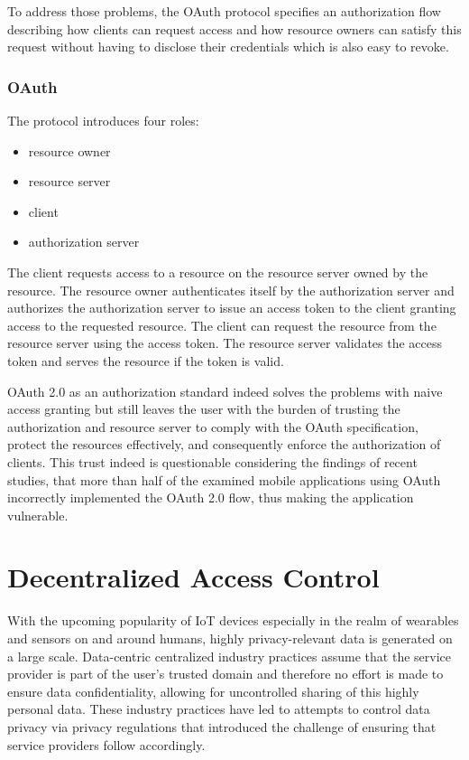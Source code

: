 \documentclass[conference]{IEEEtran}
\begin{document}
To address those problems, the OAuth protocol specifies an authorization flow describing how clients can request access and how resource owners can satisfy this request without having to disclose their credentials which is also easy to revoke. \cite{b1}

\subsubsection*{OAuth}
The protocol introduces four roles:

\begin{itemize}
  \item resource owner
  \item resource server
  \item client
  \item authorization server
\end{itemize}

The client requests access to a resource on the resource server owned by the resource.
The resource owner authenticates itself by the authorization server and authorizes the authorization server to issue an access token to the client granting access to the requested resource.
The client can request the resource from the resource server using the access token.
The resource server validates the access token and serves the resource if the token is valid.

OAuth 2.0 as an authorization standard indeed solves the problems with naive access granting but still leaves the user with the burden of trusting the authorization and resource server to comply with the OAuth specification, protect the resources effectively, and consequently enforce the authorization of clients.
This trust indeed is questionable considering the findings of recent studies, that more than half of the examined mobile applications using OAuth incorrectly implemented the OAuth 2.0 flow, thus making the application vulnerable. \cite{b2}

\section{Decentralized Access Control}
With the upcoming popularity of IoT devices especially in the realm of wearables and sensors on and around humans, highly privacy-relevant data is generated on a large scale. \cite{b5}
Data-centric centralized industry practices assume that the service provider is part of the user's trusted domain and therefore no effort is made to ensure data confidentiality, allowing for uncontrolled sharing of this highly personal data. \cite{b6}
These industry practices have led to attempts to control data privacy via privacy regulations that introduced the challenge of ensuring that service providers follow accordingly. \cite{b7}
\end{document}
